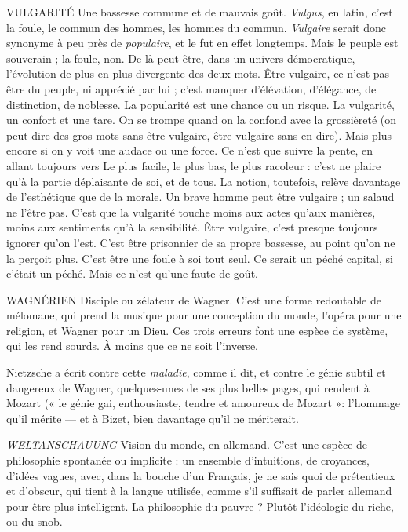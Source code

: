 VULGARITÉ Une bassesse commune et de mauvais goût.
{\it Vulgus}, en latin, c’est la foule, le commun des hommes, les
hommes du commun. {\it Vulgaire} serait donc synonyme à peu près de {\it populaire},
et le fut en effet longtemps. Mais le peuple est souverain ; la foule, non. De là
peut-être, dans un univers démocratique, l’évolution de plus en plus divergente
des deux mots. Être vulgaire, ce n’est pas être du peuple, ni apprécié par lui ;
c’est manquer d’élévation, d'élégance, de distinction, de noblesse. La popularité
est une chance ou un risque. La vulgarité, un confort et une tare. On se trompe
quand on la confond avec la grossièreté (on peut dire des gros mots sans être
vulgaire, être vulgaire sans en dire). Mais plus encore si on y voit une audace ou
une force. Ce n’est que suivre la pente, en allant toujours vers Le plus facile, le
plus bas, le plus racoleur : c’est ne plaire qu’à la partie déplaisante de soi, et de
tous. La notion, toutefois, relève davantage de l’esthétique que de la morale.
Un brave homme peut être vulgaire ; un salaud ne l’être pas. C’est que la vulgarité
touche moins aux actes qu’aux manières, moins aux sentiments qu'à la
sensibilité. Être vulgaire, c’est presque toujours ignorer qu’on l’est. C’est être
prisonnier de sa propre bassesse, au point qu’on ne la perçoit plus. C’est être
une foule à soi tout seul. Ce serait un péché capital, si c'était un péché. Mais ce
n’est qu’une faute de goût.

WAGNÉRIEN Disciple ou zélateur de Wagner. C’est une forme redoutable
de mélomane, qui prend la musique pour une conception du
monde, l’opéra pour une religion, et Wagner pour un Dieu. Ces trois erreurs
font une espèce de système, qui les rend sourds. À moins que ce ne soit
l'inverse.

Nietzsche a écrit contre cette {\it maladie}, comme il dit, et contre le génie
subtil et dangereux de Wagner, quelques-unes de ses plus belles pages, qui rendent
à Mozart (« le génie gai, enthousiaste, tendre et amoureux de Mozart »:
l'hommage qu’il mérite — et à Bizet, bien davantage qu’il ne mériterait.

{\it WELTANSCHAUUNG} Vision du monde, en allemand. C’est une espèce de
philosophie spontanée ou implicite : un ensemble
d’intuitions, de croyances, d’idées vagues, avec, dans la bouche d’un Français,
je ne sais quoi de prétentieux et d’obscur, qui tient à la langue utilisée, comme
s’il suffisait de parler allemand pour être plus intelligent. La philosophie du
pauvre ? Plutôt l’idéologie du riche, ou du snob.

